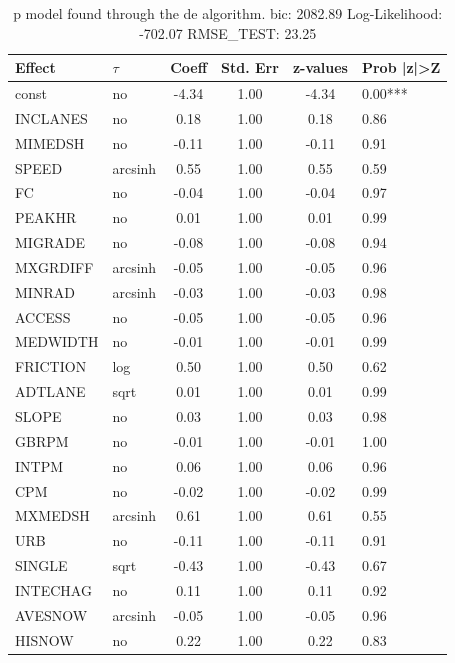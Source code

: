 \begin{table}
	\caption{p model found through the de algorithm. bic: 2082.89 Log-Likelihood: -702.07 RMSE_TEST: 23.25}
	\begin{center}
		\begin{tabular}{|l|l|c|c|c|l|}
			\hline
			Effect & $\tau$ & Coeff & Std. Err & z-values & Prob |z|>Z \\
			\hline
			const & no & -4.34 & 1.00 & -4.34 & 0.00*** \\
			\hline
			INCLANES & no & 0.18 & 1.00 & 0.18 & 0.86 \\
			\hline
			MIMEDSH & no & -0.11 & 1.00 & -0.11 & 0.91 \\
			\hline
			SPEED & arcsinh & 0.55 & 1.00 & 0.55 & 0.59 \\
			\hline
			FC & no & -0.04 & 1.00 & -0.04 & 0.97 \\
			\hline
			PEAKHR & no & 0.01 & 1.00 & 0.01 & 0.99 \\
			\hline
			MIGRADE & no & -0.08 & 1.00 & -0.08 & 0.94 \\
			\hline
			MXGRDIFF & arcsinh & -0.05 & 1.00 & -0.05 & 0.96 \\
			\hline
			MINRAD & arcsinh & -0.03 & 1.00 & -0.03 & 0.98 \\
			\hline
			ACCESS & no & -0.05 & 1.00 & -0.05 & 0.96 \\
			\hline
			MEDWIDTH & no & -0.01 & 1.00 & -0.01 & 0.99 \\
			\hline
			FRICTION & log & 0.50 & 1.00 & 0.50 & 0.62 \\
			\hline
			ADTLANE & sqrt & 0.01 & 1.00 & 0.01 & 0.99 \\
			\hline
			SLOPE & no & 0.03 & 1.00 & 0.03 & 0.98 \\
			\hline
			GBRPM & no & -0.01 & 1.00 & -0.01 & 1.00 \\
			\hline
			INTPM & no & 0.06 & 1.00 & 0.06 & 0.96 \\
			\hline
			CPM & no & -0.02 & 1.00 & -0.02 & 0.99 \\
			\hline
			MXMEDSH & arcsinh & 0.61 & 1.00 & 0.61 & 0.55 \\
			\hline
			URB & no & -0.11 & 1.00 & -0.11 & 0.91 \\
			\hline
			SINGLE & sqrt & -0.43 & 1.00 & -0.43 & 0.67 \\
			\hline
			INTECHAG & no & 0.11 & 1.00 & 0.11 & 0.92 \\
			\hline
			AVESNOW & arcsinh & -0.05 & 1.00 & -0.05 & 0.96 \\
			\hline
			HISNOW & no & 0.22 & 1.00 & 0.22 & 0.83 \\

\end{tabular}
\end{center}
\end{table}
